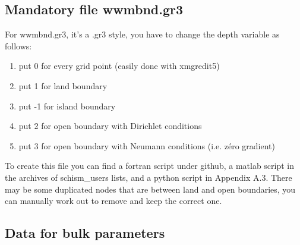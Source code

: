 \documentclass[preprints,briefreport,accept,oneauthor,pdftex]{Definitions/mdpi}
\begin{document}
\subsection{Mandatory file wwmbnd.gr3}
\noindent For wwmbnd.gr3, it's a .gr3 style, you have to change the depth variable as follows:
\begin{enumerate}
    \item put 0 for every grid point (easily done with xmgredit5)
    \item put 1 for land boundary
    \item put -1 for island boundary
    \item put 2 for open boundary with Dirichlet conditions
    \item put 3 for open boundary with Neumann conditions (i.e. zéro gradient)
\end{enumerate}
To create this file you can find a fortran script under github, a matlab script in the archives of schism\_users lists, and a python script in Appendix A.3.
There may be some duplicated nodes that are between land and open boundaries, you can manually work out to remove and keep the correct one.\\
\subsection{Data for bulk parameters}
\end{document}
